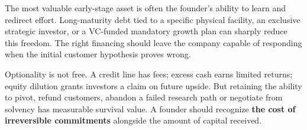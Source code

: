 The most valuable early-stage asset is often the founder's ability to learn and redirect effort. Long-maturity debt tied to a specific physical facility, an exclusive strategic investor, or a VC-funded mandatory growth plan can sharply reduce this freedom. The right financing should leave the company capable of responding when the initial customer hypothesis proves wrong.

Optionality is not free. A credit line has fees; excess cash earns limited returns; equity dilution grants investors a claim on future upside. But retaining the ability to pivot, refund customers, abandon a failed research path or negotiate from solvency has measurable survival value. A founder should recognize \textbf{the cost of irreversible commitments} alongside the amount of capital received.

